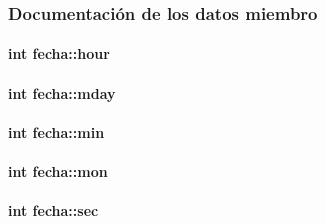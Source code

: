 \subsubsection{Documentación de los datos miembro}
\hypertarget{classfecha_a895a2cc9dd11326a8392a4c6fc928a14}{}
\paragraph[{hour}]{\setlength{\rightskip}{0pt plus 5cm}int fecha\+::hour\hspace{0.3cm}{\ttfamily [private]}}\label{classfecha_a895a2cc9dd11326a8392a4c6fc928a14}
\hypertarget{classfecha_a9c1dc50e5f5efcd3e30a981bfd495b1d}{}
\paragraph[{mday}]{\setlength{\rightskip}{0pt plus 5cm}int fecha\+::mday\hspace{0.3cm}{\ttfamily [private]}}\label{classfecha_a9c1dc50e5f5efcd3e30a981bfd495b1d}
\hypertarget{classfecha_a3875f28ff6e7c383923c80e86afaec2e}{}
\paragraph[{min}]{\setlength{\rightskip}{0pt plus 5cm}int fecha\+::min\hspace{0.3cm}{\ttfamily [private]}}\label{classfecha_a3875f28ff6e7c383923c80e86afaec2e}
\hypertarget{classfecha_a5c86be74f1215600f99798d54126ba16}{}
\paragraph[{mon}]{\setlength{\rightskip}{0pt plus 5cm}int fecha\+::mon\hspace{0.3cm}{\ttfamily [private]}}\label{classfecha_a5c86be74f1215600f99798d54126ba16}
\hypertarget{classfecha_a09eb9f4865c9ff896f438b8df3cf6485}{}
\paragraph[{sec}]{\setlength{\rightskip}{0pt plus 5cm}int fecha\+::sec\hspace{0.3cm}{\ttfamily [private]}}\label{classfecha_a09eb9f4865c9ff896f438b8df3cf6485}
\hypertarget{classfecha_a4d06534f05a6350ae229ce2b17b860e8}{}
